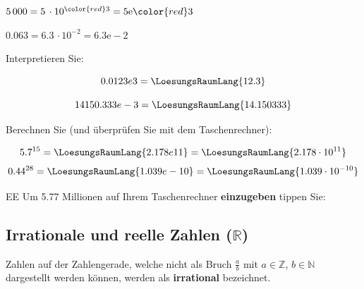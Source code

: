 $5\,000 = 5\, \cdot 10^{\color{red}3} = 5\mathrm{e}\color{red}3$

$0.063 = 6.3\, \cdot 10^{-2} = 6.3\mathrm{e-}2$

Interpretieren Sie:

\leserluft{}

$$0.0123e3 = \LoesungsRaumLang{12.3}$$

\leserluft{}

$$14150.333e-3 =\LoesungsRaumLang{14.150333}$$


Berechnen Sie (und überprüfen Sie mit dem Taschenrechner):

$$5.7^{15} = \LoesungsRaumLang{2.178e11} = \LoesungsRaumLang{2.178 \cdot{} 10^{11}}$$
$$0.44^{28} =\LoesungsRaumLang{1.039e-10} = \LoesungsRaumLang{1.039\cdot{} 10^{-10}}$$
\begin{rezept}{EE}{}
    Um 5.77 Millionen auf Ihrem Taschenrechner \textbf{einzugeben} tippen Sie:

\begin{center}  \noTRAINER{\vspace{5mm}} \end{center}

\end{rezept}
\newpage

\subsection{Irrationale und reelle Zahlen ($\mathbb{R}$)}



  Zahlen auf der Zahlengerade, welche nicht als Bruch $\frac{a}{b}$ mit $a\in\mathbb{Z}$, $b \in \mathbb{N}$ dargestellt werden können, werden als \textbf{irrational} bezeichnet.

